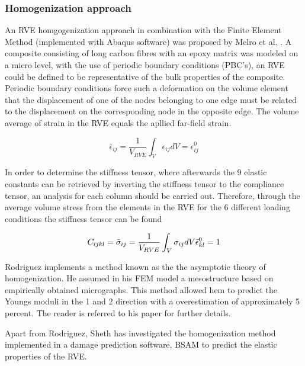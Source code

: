 \subsubsection{Homogenization approach}
An RVE homgogenization approach in combination with the Finite Element Method (implemented with Abaqus software) was proposed by Melro et al. \cite{Melro2012InfluenceMaterials}. A composite consisting of long carbon fibres with an epoxy matrix was modeled on a micro level, with the use of periodic boundary conditions (PBC's), an RVE could be defined to be representative of the bulk properties of the composite. Periodic boundary conditions force such a deformation on the volume element that the displacement of one of the nodes belonging to one edge must be related to the displacement on the corresponding node in the opposite edge\cite{Melro2012InfluenceMaterials}. The volume average of strain in the RVE equals the apllied far-field strain.

\begin{equation}\label{Somireddy2}
\bar{\epsilon}_{ij}=\frac{1}{V_{RVE}}\int_V \epsilon_{ij}dV=\epsilon_{ij}^0
\end{equation}

In order to determine the stiffness tensor, where afterwards the 9 elastic constants can be retrieved by inverting the stiffness tensor to the compliance tensor, an analysis for each column should be carried out. Therefore, through the average volume stress from the elements in the RVE for the 6 different loading conditions the stiffness tensor can be found

\begin{equation}\label{eqn:homogenization}
C_{ijkl}=\bar{\sigma}_{ij}=\frac{1}{V_{RVE}}\int_V \sigma_{ij}dV \\ 
\bar{\epsilon}_{kl}^0=1
\end{equation}


Rodriguez \cite{Rodriguez2003MechanicalModeling} implements a method known as the the asymptotic theory of homogenization. He assumed in his FEM model a mesostructure based on empirically obtained micrographs. This method allowed hem to predict the Youngs moduli in the 1 and 2 direction with a overestimation of approximately 5 percent.  The reader is referred to his paper for further details.

Apart from Rodriguez, Sheth \cite{Sheth2017NumericalOrientation} has investigated the homogenization method implemented in a damage prediction software, BSAM to predict the elastic properties of the RVE.

